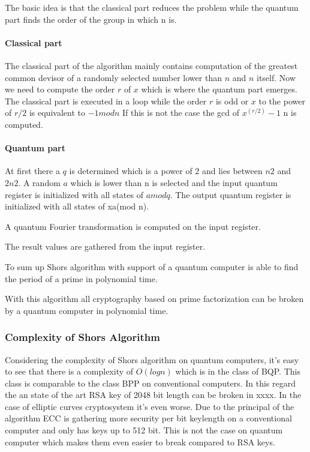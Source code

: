 The basic idea is that the classical part reduces the problem while the quantum part finds the order of the group in which n is. 
\paragraph{Classical part}
The classical part of the algorithm mainly contains computation of the greatest common devisor of a randomly selected number lower than $n$ and $n$ itself. Now we need to compute the order $r$ of $x$ which is where the quantum part emerges. The classical part is executed in a loop while the order $r$ is odd or $x$ to the power of $r/2$ is equivalent to $-1 mod n$   
If this is not the case the gcd of $x^(r / 2) -1$ n is computed.
\paragraph{Quantum part}
At first there a $q$ is determined which is a power of $2$ and lies between $n2$ and $2 n2$. 
A random $a$ which is lower than n is selected and the input quantum register is initialized with all states of $a mod q$. 
The output quantum register is initialized with all states of xa(mod n). 

A quantum Fourier transformation is computed on the input register. 

The result values are gathered from the input register. 

To sum up Shors algorithm with support of a quantum computer is able to find the period of a prime in polynomial time. 

With this algorithm all cryptography based on prime factorization can be broken by a quantum computer in polynomial time. 

\subsubsection{Complexity of Shors Algorithm} 
Considering the complexity of Shors algorithm on quantum computers, it's easy to see that there is a complexity of $O(log n)$ which is in the class of BQP. This class is comparable to the class BPP on conventional computers. In this regard the an state of the art RSA key of 2048 bit length can be broken in xxxx. In the case of elliptic curves cryptosystem it's even worse. Due to the principal of the algorithm ECC is gathering more security per bit keylength on a conventional computer and only has keys up to 512 bit. This is not the case on quantum computer which makes them even easier to break compared to RSA keys.

